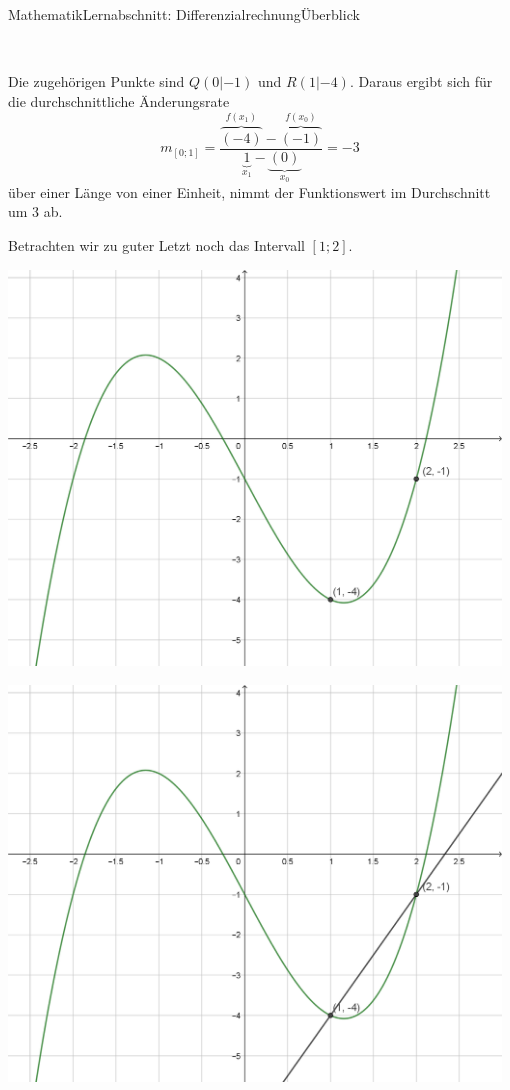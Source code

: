 \documentclass[11pt,twocolumn,oneside,openany,headings=optiontotoc,11pt,numbers=noenddot,final]{article}
\begin{document}
\begin{worksheet}{Mathematik}{Lernabschnitt: Differenzialrechnung}{Überblick}
\begin{minipage}{0.2\textwidth}
		\end{minipage}\\
		\par\noindent
		Die zugehörigen Punkte sind \(Q(0|-1)\) und \(R(1|-4)\). Daraus ergibt sich für die durchschnittliche Änderungsrate
		\[m_{[0;1]} = \frac{\overbrace{(-4)}^{f(x_1)} - \overbrace{(-1)}^{f(x_0)}}{\underbrace{1}_{x_1} - \underbrace{(0)}_{x_0}} = -3\]
		über einer Länge von einer Einheit, nimmt der Funktionswert im Durchschnitt um \(3\) ab.\\
		\par\noindent
		Betrachten wir zu guter Letzt noch das Intervall \([1;2]\).\\
		\par\noindent
		\begin{minipage}{0.2\textwidth}
			\includegraphics[width=0.98\textwidth,align=t]{../99_Bilder/04_Skr_DifQuo2.png}
		\end{minipage}
		\hfill
		\begin{minipage}{0.2\textwidth}
			\includegraphics[width=0.98\textwidth,align=t]{../99_Bilder/04_Skr_DifQuo2_G.png}

\end{minipage}
\end{worksheet}
\end{document}

